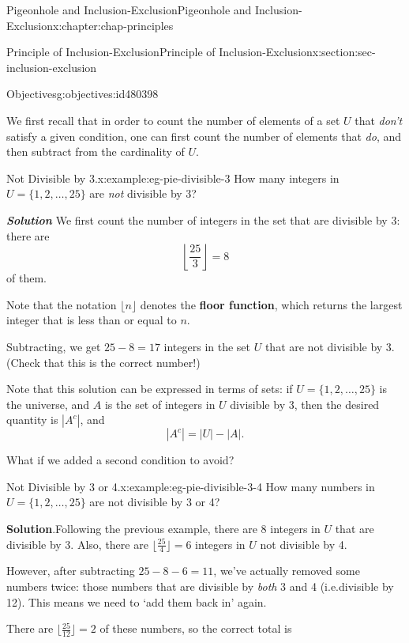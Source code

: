 \documentclass[oneside,10pt,]{book}
\newcommand{\blocktitlefont}{\relax}
\newcommand{\alert}[1]{\textbf{\textit{#1}}}
\newcommand{\terminology}[1]{\textbf{#1}}
\numberwithin{equation}{section}
\begin{document}
\begin{chapterptx}{Pigeonhole and Inclusion-Exclusion}{}{Pigeonhole and Inclusion-Exclusion}{}{}{x:chapter:chap-principles}
\begin{sectionptx}{Principle of Inclusion-Exclusion}{}{Principle of Inclusion-Exclusion}{}{}{x:section:sec-inclusion-exclusion}
\begin{objectives}{Objectives}{g:objectives:id480398}
\begin{itemize}[label=\textbullet]
\end{itemize}
\end{objectives}
We first recall that in order to count the number of elements of a set \(U\) that \emph{don't} satisfy a given condition, one can first count the number of elements that \emph{do}, and then subtract from the cardinality of \(U\).%
\begin{example}{Not Divisible by 3.}{x:example:eg-pie-divisible-3}%
How many integers in \(U = \{1,2,\ldots,25\}\) are \emph{not} divisible by 3?%
\par
\alert{Solution} \label{g:notation:id480587} We first count the number of integers in the set that are divisible by 3: there are%
\begin{equation*}
\left\lfloor \frac{25}{3}\right\rfloor = 8
\end{equation*}
of them.%
\par
Note that the notation \(\lfloor n \rfloor\) denotes the \terminology{floor function}, which returns the largest integer that is less than or equal to \(n\).%
\par
Subtracting, we get \(25 - 8 = 17\) integers in the set \(U\) that are not divisible by 3. (Check that this is the correct number!)%
\end{example}
Note that this solution can be expressed in terms of sets: if \(U = \{1,2,\ldots,25\}\) is the universe, and \(A\) is the set of integers in \(U\) divisible by 3, then the desired quantity is \(|A^c|\), and%
\begin{equation*}
|A^c| = |U| - |A|\text{.}
\end{equation*}
%
\par
What if we added a second condition to avoid?%
\begin{example}{Not Divisible by 3 or 4.}{x:example:eg-pie-divisible-3-4}%
How many numbers in \(U = \{1,2,\ldots,25\}\) are not divisible by 3 or 4?%
\par\smallskip%
\noindent\textbf{\blocktitlefont Solution}.\hypertarget{g:solution:id480813}{}\quad{}Following the previous example, there are \(8\) integers in \(U\) that are divisible by 3. Also, there are \(\lfloor \frac{25}{4} \rfloor = 6\) integers in \(U\) not divisible by 4.%
\par
However, after subtracting \(25 - 8 - 6 = 11\), we've actually removed some numbers twice: those numbers that are divisible by \emph{both} 3 and 4 (i.e.\@ divisible by 12). This means we need to `add them back in' again.%
\par
There are \(\lfloor \frac{25}{12} \rfloor = 2\) of these numbers, so the correct total is%

\end{example}
\end{sectionptx}
\end{chapterptx}
\end{document}
